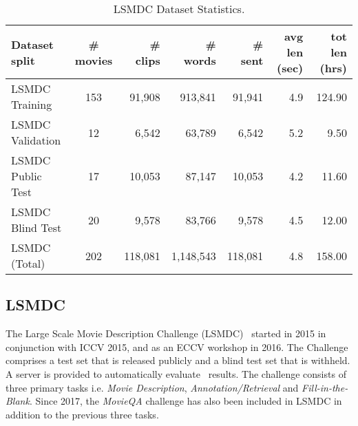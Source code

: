 \documentclass[10pt,journal,compsoc]{IEEEtran}
\begin{document}
\begin{table*}[htbp]
  \centering
  \small
  \caption{LSMDC Dataset Statistics.}
 \vspace{-2mm}
   \begin{tabular}{|l|c|r|r|r|r|r|}
    \hline

	\textbf{Dataset split} & \textbf{\# movies} & \textbf{\# clips} & \textbf{\# words} & \textbf{\# sent} & \textbf{avg len (sec)} & \textbf{tot len (hrs)} \\
    \hline
    LSMDC Training & 153   & 91,908 & 913,841 & 91,941 & 4.9   & 124.90 \\
    \hline
    LSMDC Validation & 12    & 6,542 & 63,789 & 6,542 & 5.2   & 9.50 \\
    \hline
    LSMDC Public Test & 17    & 10,053 & 87,147 & 10,053 & 4.2   & 11.60 \\
    \hline
    LSMDC Blind Test & 20    & 9,578 & 83,766 & 9,578 & 4.5   & 12.00 \\
    \hline
    LSMDC (Total) & 202   & 118,081 & 1,148,543 & 118,081 & 4.8   & 158.00 \\
    \hline
    \end{tabular}%
  \label{tab:LSMDC}%
\vspace{-3mm}
\end{table*}%

\subsection{LSMDC} 
The Large Scale Movie Description Challenge (LSMDC)~\cite{LSMDC2015} started in 2015 in conjunction with ICCV 2015, and as an ECCV workshop in 2016. The Challenge comprises a test set that is released publicly and a blind test set that is withheld. A server is provided to automatically evaluate~\cite{LSMDCEval} results. The challenge consists of three primary tasks i.e. {\it Movie Description}, {\it Annotation/Retrieval} and {\it Fill-in-the-Blank}. Since 2017, the {\it MovieQA} challenge has also been included in LSMDC in addition to the previous three tasks. 
\end{document}
